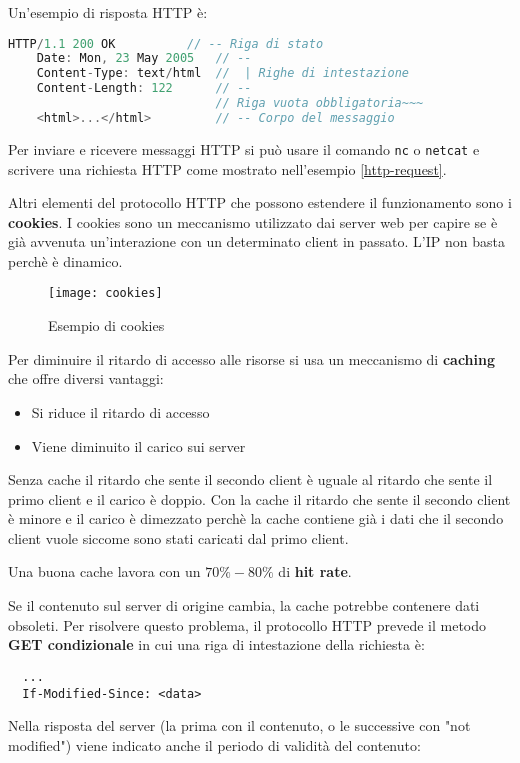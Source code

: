 \documentclass[a4paper]{article}
\begin{document}
\begin{example}
  Un'esempio di risposta HTTP è:
  \begin{lstlisting}[language=Scala]
    HTTP/1.1 200 OK          // -- Riga di stato
    Date: Mon, 23 May 2005   // -- 
    Content-Type: text/html  //  | Righe di intestazione
    Content-Length: 122      // -- 
                             // Riga vuota obbligatoria~~~
    <html>...</html>         // -- Corpo del messaggio
  \end{lstlisting}
\end{example}

\noindent
Per inviare e ricevere messaggi HTTP si può usare il comando \texttt{nc} o \texttt{netcat}
e scrivere una richiesta HTTP come mostrato nell'esempio \ref{http-request}.

\vspace{1em}
\noindent
Altri elementi del protocollo HTTP che possono estendere il funzionamento sono i \textbf{
cookies}. I cookies sono un meccanismo utilizzato dai server web per capire se è già
avvenuta un'interazione con un determinato client in passato. L'IP non basta perchè
è dinamico.
\begin{figure}[H]
  \centering
  \texttt{[image: cookies]}
  \caption{Esempio di cookies}
\end{figure}

\vspace{1em}
\noindent
Per diminuire il ritardo di accesso alle risorse si usa un meccanismo di \textbf{caching}
che offre diversi vantaggi:
\begin{itemize}
  \item Si riduce il ritardo di accesso
  \item Viene diminuito il carico sui server
\end{itemize}
\label{23-10-D1}
Senza cache il ritardo che sente il secondo client è uguale al ritardo che sente il primo client e il
carico è doppio.
\label{23-10-D2}
Con la cache il ritardo che sente il secondo client è minore e il carico è dimezzato 
perchè la cache contiene già i dati che il secondo client vuole siccome sono stati
caricati dal primo client.

\vspace{1em}
\noindent
Una buona cache lavora con un \( 70\%-80\% \) di \textbf{hit rate}. 

Se il contenuto sul server di origine cambia, la cache potrebbe contenere dati obsoleti.
Per risolvere questo problema, il protocollo HTTP prevede il metodo \textbf{GET condizionale}
in cui una riga di intestazione della richiesta è:
\begin{lstlisting}
  ...
  If-Modified-Since: <data>
\end{lstlisting}
\label{23-10-D3}
\noindent
Nella risposta del server (la prima con il contenuto, o le successive con "not modified")
viene indicato anche il periodo di validità del contenuto:
\end{document}
